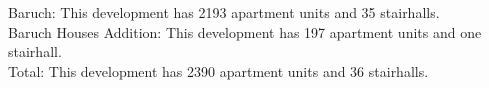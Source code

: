 {Baruch}: This development has 2193 apartment units and 35 stairhalls.\\{Baruch Houses Addition}: This development has 197 apartment units and one stairhall.\\{Total}: This development has 2390 apartment units and 36 stairhalls.\\